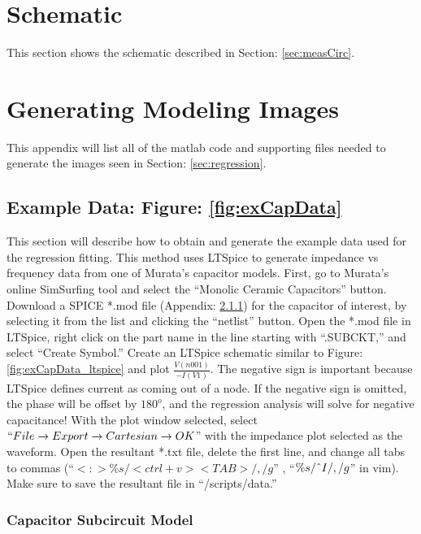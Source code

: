 \appendix{}
\appendixheaderon

\section{Schematic}
\label{app:schematic}
This section shows the schematic described in Section: \ref{sec:measCirc}.



\section{Generating Modeling Images}
\label{app:genModelingImages}
This appendix will list all of the matlab code and supporting files needed to generate the images seen in Section: \ref{sec:regression}.

\subsection{Example Data: Figure: \ref{fig:exCapData}}


This section will describe how to obtain and generate the example data used for the regression fitting. This method uses LTSpice to generate impedance vs frequency data from one of Murata's capacitor models. First, go to Murata's online SimSurfing tool \cite{simSurfing} and select the ``Monolic Ceramic Capacitors'' button. Download a SPICE *.mod file (Appendix: \ref{app:subcir}) for the capacitor of interest, by selecting it from the list and clicking the ``netlist'' button. Open the *.mod file in LTSpice, right click on the part name in the line starting with ``.SUBCKT,'' and select ``Create Symbol.'' Create an LTSpice schematic similar to Figure: \ref{fig:exCapData_ltspice} and plot $\frac{V(n001)}{-I(V1)}$. The negative sign is important because LTSpice defines current as coming out of a node. If the negative sign is omitted, the phase will be offset by $180^o$, and the regression analysis will solve for negative capacitance! With the plot window selected, select  $``File\rightarrow Export\rightarrow Cartesian\rightarrow OK$'' with the impedance plot selected as the waveform. Open the resultant *.txt file, delete the first line, and change all tabs to commas (``$<:>\%s/<ctrl+v><TAB>/,/g$'' , ``$\%s/\string^I/,/g$'' in vim). Make sure to save the resultant file in ``/scripts/data.''

\subsubsection{Capacitor Subcircuit Model}
\label{app:subcir}


